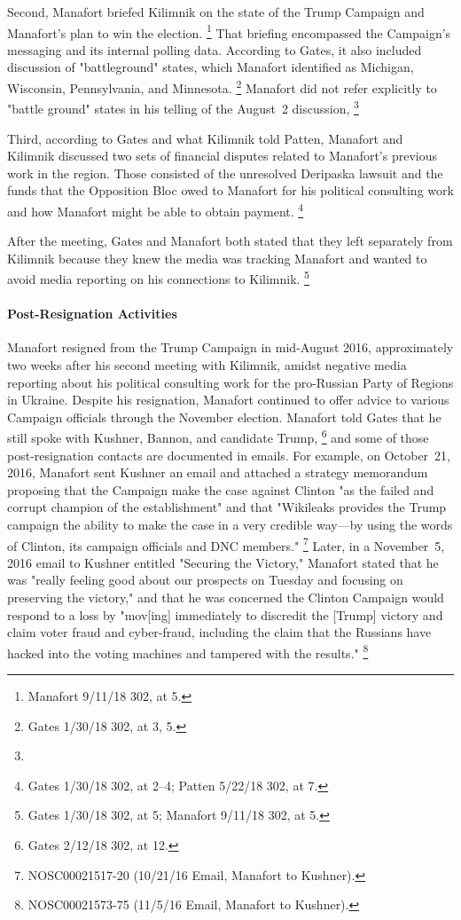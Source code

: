 Second, Manafort briefed Kilimnik on the state of the Trump Campaign and Manafort's plan to win the election.%
\footnote{Manafort 9/11/18 302, at 5.}
That briefing encompassed the Campaign's messaging and its internal polling data.
According to Gates, it also included discussion of "battleground" states, which Manafort identified as Michigan, Wisconsin, Pennsylvania, and Minnesota.%
\footnote{Gates 1/30/18 302, at 3, 5.}
Manafort did not refer explicitly to "battle ground" states in his telling of the August~2 discussion,
\footnote{}

Third, according to Gates and what Kilimnik told Patten, Manafort and Kilimnik discussed two sets of financial disputes related to Manafort's previous work in the region.
Those consisted of the unresolved Deripaska lawsuit and the funds that the Opposition Bloc owed to Manafort for his political consulting work and how Manafort might be able to obtain payment.%
\footnote{Gates 1/30/18 302, at 2--4;
Patten 5/22/18 302, at 7.}

After the meeting, Gates and Manafort both stated that they left separately from Kilimnik because they knew the media was tracking Manafort and wanted to avoid media reporting on his connections to Kilimnik.%
\footnote{Gates 1/30/18 302, at 5;
Manafort 9/11/18 302, at 5.}

\paragraph{Post-Resignation Activities}

Manafort resigned from the Trump Campaign in mid-August 2016, approximately two weeks after his second meeting with Kilimnik, amidst negative media reporting about his political consulting work for the pro-Russian Party of Regions in Ukraine.
Despite his resignation, Manafort continued to offer advice to various Campaign officials through the November election.
Manafort told Gates that he still spoke with Kushner, Bannon, and candidate Trump,%
\footnote{Gates 2/12/18 302, at 12.}
and some of those post-resignation contacts are documented in emails.
For example, on October~21, 2016, Manafort sent Kushner an email and attached a strategy memorandum proposing that the Campaign make the case against Clinton "as the failed and corrupt champion of the establishment" and that "Wikileaks provides the Trump campaign the ability to make the case in a very credible way---by using the words of Clinton, its campaign officials and DNC members."%
\footnote{NOSC00021517-20 (10/21/16 Email, Manafort to Kushner).}
Later, in a November~5, 2016 email to Kushner entitled "Securing the Victory," Manafort stated that he was "really feeling good about our prospects on Tuesday and focusing on preserving the victory," and that he was concerned the Clinton Campaign would respond to a loss by "mov[ing] immediately to discredit the [Trump] victory and claim voter fraud and cyber-fraud, including the claim that the Russians have hacked into the voting machines and tampered with the results."%
\footnote{NOSC00021573-75 (11/5/16 Email, Manafort to Kushner).}

